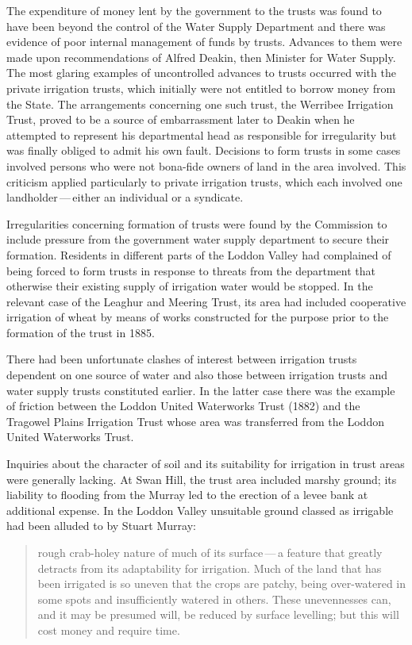 The expenditure of money lent by the government to the trusts was
found to have been beyond the control of the Water Supply Department
and there was evidence of poor internal management of funds by trusts.
Advances to them were made upon recommendations of Alfred Deakin,
  then Minister
for Water Supply.  The most glaring examples of uncontrolled advances
to trusts occurred with the private irrigation trusts, which initially
were not entitled to borrow money from the State.  The arrangements
concerning one such trust, the Werribee Irrigation Trust,
 proved to be
a source of embarrassment later to Deakin when he attempted to
represent his departmental head as responsible for irregularity but
was finally obliged to admit his own fault.  Decisions to form trusts
in some cases involved persons who were not bona-fide owners of land
in the area involved.  This criticism applied particularly to private
irrigation trusts, which each involved one landholder\,---\,either an
individual or a syndicate.

Irregularities concerning formation of trusts were found by the
Commission to include pressure from the government water supply
department to secure their formation.  Residents in different parts of
the Loddon Valley  had complained of being forced
to form trusts in response to threats from the department that
otherwise their existing supply of irrigation water would be stopped.
In the relevant case of the Leaghur and Meering Trust,
 its area had
included cooperative irrigation of wheat by means of works constructed
for the purpose prior to the formation of the trust in 1885.

There had been unfortunate clashes of interest between irrigation
trusts dependent on one source of water and also those between
irrigation trusts and water supply trusts constituted earlier.  In the
latter case there was the example of friction between the Loddon
United Waterworks Trust  (1882)
and the Tragowel Plains Irrigation Trust
 whose area was transferred
from the Loddon United Waterworks Trust.


Inquiries about the character of soil and its suitability for
irrigation in trust areas were generally lacking.  At Swan Hill,
 the
trust area included marshy ground; its liability to flooding from the
Murray led to the erection of a levee bank at additional expense.  In
the Loddon Valley unsuitable ground classed as irrigable had been
alluded to by Stuart Murray: 
\begin{quote}
	rough crab-holey nature of much of its surface\,---\,a feature
	that greatly detracts from its adaptability for irrigation.
	Much of the land that has been irrigated is so uneven that the
	crops are patchy, being over-watered in some spots and
	insufficiently watered in others.  These unevennesses can, and
	it may be presumed will, be reduced by surface levelling; but
	this will cost money and require time.
\end{quote}

